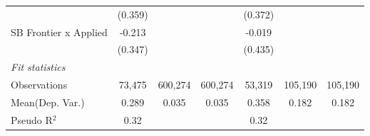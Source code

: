 \begin{tabular}{lcccccc}
                         & (0.359)       &         &         & (0.372)       &         &   \\   
   SB Frontier x Applied & -0.213        &         &         & -0.019        &         &   \\   
                         & (0.347)       &         &         & (0.435)       &         &   \\   
   \midrule
   \emph{Fit statistics}\\
   Observations          & 73,475        & 600,274 & 600,274 & 53,319        & 105,190 & 105,190\\  
Mean(Dep. Var.) & 0.289 & 0.035 & 0.035 & 0.358 & 0.182 & 0.182 \\
   Pseudo R$^2$          & 0.32          &         &         & 0.32          &         & \\  
   

\end{tabular}
